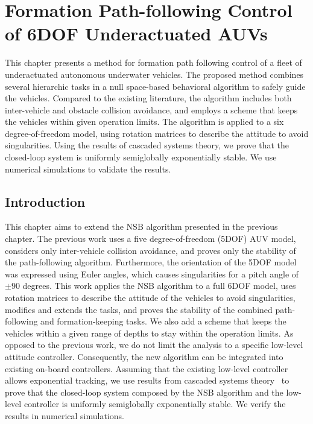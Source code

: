\chapter{Formation Path-following Control of 6DOF Underactuated AUVs}
\label{chap:NSB_R}

This chapter presents a method for formation path following control of a fleet of underactuated autonomous underwater vehicles.
The proposed method combines several hierarchic tasks in a null space-based behavioral algorithm to safely guide the vehicles.
Compared to the existing literature, the algorithm includes both inter-vehicle and obstacle collision avoidance, and employs a scheme that keeps the vehicles within given operation limits.
The algorithm is applied to a six degree-of-freedom model, using rotation matrices to describe the attitude to avoid singularities.
Using the results of cascaded systems theory, we prove that the closed-loop system is uniformly semiglobally exponentially stable.
We use numerical simulations to validate the results.

\section{Introduction}

This chapter aims to extend the NSB algorithm presented in the previous chapter.
The previous work uses a five degree-of-freedom (5DOF) AUV model, considers only inter-vehicle collision avoidance, and proves only the stability of the path-following algorithm.
Furthermore, the orientation of the 5DOF model was expressed using Euler angles, which causes singularities for a pitch angle of $\pm90$ degrees.
This work applies the NSB algorithm to a full 6DOF model, uses rotation matrices to describe the attitude of the vehicles to avoid singularities, modifies and extends the tasks, and proves the stability of the combined path-following and formation-keeping tasks.
We also add a scheme that keeps the vehicles within a given range of depths to stay within the operation limits.
As opposed to the previous work, we do not limit the analysis to a specific low-level attitude controller.
Consequently, the new algorithm can be integrated into existing on-board controllers.
Assuming that the existing low-level controller allows exponential tracking, we use results from cascaded systems theory~\cite{pettersen_lyapunov_2017} to prove that the closed-loop system composed by the NSB algorithm and the low-level controller is uniformly semiglobally exponentially stable.
We verify the results in numerical simulations.

